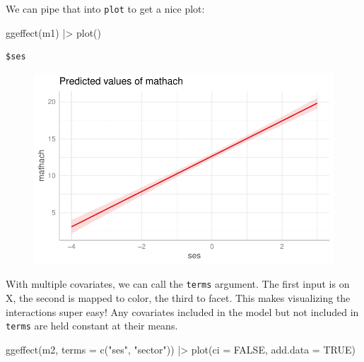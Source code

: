 \documentclass[
  letterpaper,
  DIV=11,
  numbers=noendperiod]{scrreprt}
\newenvironment{Shaded}{\begin{snugshade}}{\end{snugshade}}
\newcommand{\AttributeTok}[1]{\textcolor[rgb]{0.49,0.56,0.16}{#1}}
\newcommand{\ConstantTok}[1]{\textcolor[rgb]{0.53,0.00,0.00}{#1}}
\newcommand{\FunctionTok}[1]{\textcolor[rgb]{0.02,0.16,0.49}{#1}}
\newcommand{\NormalTok}[1]{\textcolor[rgb]{0.00,0.44,0.13}{#1}}
\newcommand{\SpecialCharTok}[1]{\textcolor[rgb]{0.25,0.44,0.63}{#1}}
\newcommand{\StringTok}[1]{\textcolor[rgb]{0.25,0.44,0.63}{#1}}
\begin{document}
We can pipe that into \texttt{plot} to get a nice plot:

\begin{Shaded}
\begin{Highlighting}[]
\FunctionTok{ggeffect}\NormalTok{(m1) }\SpecialCharTok{|\textgreater{}} 
  \FunctionTok{plot}\NormalTok{()}
\end{Highlighting}
\end{Shaded}

\begin{verbatim}
$ses
\end{verbatim}

\begin{figure}[H]

{\centering \includegraphics{ggeffects_files/figure-pdf/unnamed-chunk-5-1.pdf}

}

\end{figure}

With multiple covariates, we can call the \texttt{terms} argument. The
first input is on X, the second is mapped to color, the third to facet.
This makes visualizing the interactions super easy! Any covariates
included in the model but not included in \texttt{terms} are held
constant at their means.

\begin{Shaded}
\begin{Highlighting}[]
\FunctionTok{ggeffect}\NormalTok{(m2, }\AttributeTok{terms =} \FunctionTok{c}\NormalTok{(}\StringTok{"ses"}\NormalTok{, }\StringTok{"sector"}\NormalTok{)) }\SpecialCharTok{|\textgreater{}} 
  \FunctionTok{plot}\NormalTok{(}\AttributeTok{ci =} \ConstantTok{FALSE}\NormalTok{, }\AttributeTok{add.data =} \ConstantTok{TRUE}\NormalTok{)}
\end{Highlighting}
\end{Shaded}
\end{document}
